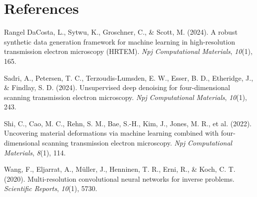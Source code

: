 \documentclass[
]{agujournal2019}
\newlength{\cslhangindent}
\newenvironment{CSLReferences}[2] %
 {\begin{list}{}{%
  \setlength{\itemindent}{0pt}
  \setlength{\leftmargin}{0pt}
  \setlength{\parsep}{0pt}
  \ifodd #1
   \setlength{\leftmargin}{\cslhangindent}
   \setlength{\itemindent}{-1\cslhangindent}
  \fi
  \setlength{\itemsep}{#2\baselineskip}}}
 {\end{list}}
\begin{document}
\section*{References}\label{references}

\label{refs}
\begin{CSLReferences}{1}{0}
\vspace{1em}

Rangel DaCosta, L., Sytwu, K., Groschner, C., \& Scott, M. (2024). A
robust synthetic data generation framework for machine learning in
high-resolution transmission electron microscopy (HRTEM). \emph{Npj
Computational Materials}, \emph{10}(1), 165.

Sadri, A., Petersen, T. C., Terzoudis-Lumsden, E. W., Esser, B. D.,
Etheridge, J., \& Findlay, S. D. (2024). Unsupervised deep denoising for
four-dimensional scanning transmission electron microscopy. \emph{Npj
Computational Materials}, \emph{10}(1), 243.

Shi, C., Cao, M. C., Rehn, S. M., Bae, S.-H., Kim, J., Jones, M. R., et
al. (2022). Uncovering material deformations via machine learning
combined with four-dimensional scanning transmission electron
microscopy. \emph{Npj Computational Materials}, \emph{8}(1), 114.

Wang, F., Eljarrat, A., Müller, J., Henninen, T. R., Erni, R., \& Koch,
C. T. (2020). Multi-resolution convolutional neural networks for inverse
problems. \emph{Scientific Reports}, \emph{10}(1), 5730.

\end{CSLReferences}
\end{document}

